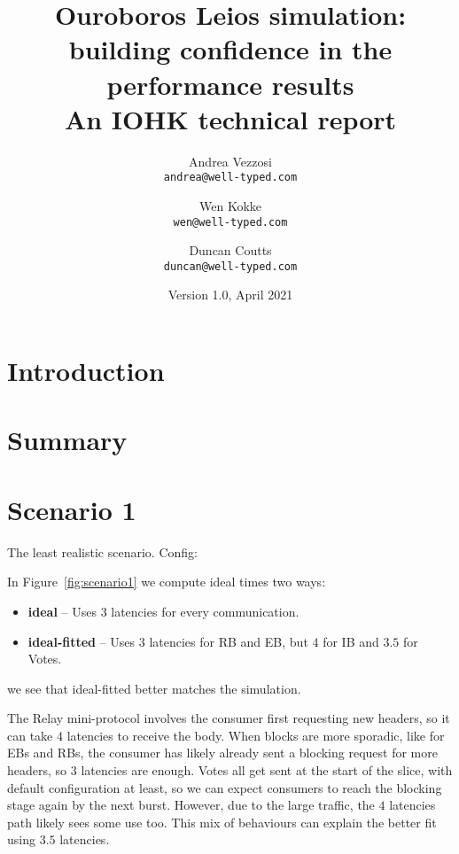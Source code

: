 \documentclass[11pt,a4paper]{article}
\begin{document}
\title{Ouroboros Leios simulation: \\
       building confidence in the performance results \\
       {\large \sc An IOHK technical report}
  }
\date{Version 1.0, April 2021}
\author{Andrea Vezzosi     \\ {\small \texttt{andrea@well-typed.com}} \\
   \and Wen Kokke          \\ {\small \texttt{wen@well-typed.com}} \\
   \and Duncan Coutts      \\ {\small \texttt{duncan@well-typed.com}}
   }

\maketitle

\section{Introduction}
\label{introduction}


\tableofcontents

\listoftodos

\section{Summary}
\label{summary}

\section{Scenario 1}
\label{scenario1}
The least realistic scenario. Config:


In Figure~\ref{fig:scenario1} we compute ideal times two ways:
\begin{itemize}
\item \textbf{ideal} -- Uses $3$ latencies for every communication.
\item \textbf{ideal-fitted} -- Uses $3$ latencies for RB and EB, but $4$ for IB and $3.5$ for Votes.
\end{itemize}
we see that ideal-fitted better matches the simulation.

The Relay mini-protocol involves the consumer first requesting new headers, so
it can take $4$ latencies to receive the body. When blocks are more sporadic,
like for EBs and RBs, the consumer has likely already sent a blocking request
for more headers, so $3$ latencies are enough.
Votes all get sent at the start of the slice, with default configuration at least, so we can expect consumers to reach the blocking stage again by the next burst. However, due to the large traffic, the $4$ latencies path likely sees some use too. This mix of behaviours can explain the better fit using $3.5$ latencies.
\end{document}
